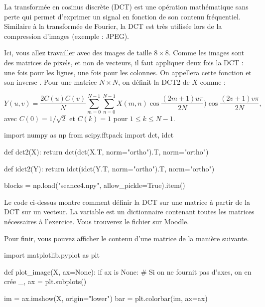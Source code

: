 \documentclass [a4paper, 11pt] {article}
\begin{document}
    \begin{exercice}{2}
    
        La transformée en cosinus discrète (DCT) est une opération mathématique sans perte qui permet d'exprimer un signal en fonction de son contenu fréquentiel. Similaire à la transformée de Fourier, la DCT est très utilisée lors de la compression d'images (exemple : JPEG).
        
        Ici, vous allez travailler avec des images de taille $8 \times 8$. Comme les images sont des matrices de pixels, et non de vecteurs, il faut appliquer deux fois la DCT : une fois pour les lignes, une fois pour les colonnes. On appellera cette fonction  et son inverse . Pour une matrice $N\times N$, on définit la DCT2 de $X$ comme :
        
        \begin{equation}
            Y(u,v) = \frac{2 C(u) C(v)}{N} \sum\limits_{m=0}^{N-1}\sum\limits_{n=0}^{N-1} X(m,n) \cos\frac{(2m+1)u\pi}{2N})\cos\frac{(2v+1)v\pi}{2N},
        \end{equation}
        avec $C(0)=1/\sqrt{2}$ et $C(k) = 1$ pour $1 \le k \le N-1$.
    
        \begin{python}
import numpy as np
from scipy.fftpack import dct, idct

def dct2(X):
    return dct(dct(X.T, norm="ortho").T, norm="ortho")

def idct2(Y):
    return idct(idct(Y.T, norm="ortho").T, norm="ortho")

blocks = np.load("seance4.npy", allow_pickle=True).item()
        \end{python}
        
        Le code ci-dessus montre comment définir la DCT sur une matrice à partir de la DCT sur un vecteur. La variable  est un dictionnaire contenant toutes les matrices nécessaires à l'exercice. Vous trouverez le fichier  sur Moodle.
        
        Pour finir, vous pouvez afficher le contenu d'une matrice de la manière suivante.
        
        \begin{python}
import matplotlib.pyplot as plt

def plot_image(X, ax=None):
    if ax is None:  # Si on ne fournit pas d'axes, on en crée
        _, ax = plt.subplots()

    im = ax.imshow(X, origin="lower")
    bar = plt.colorbar(im, ax=ax)


\end{python}
\end{exercice}
\end{document}
